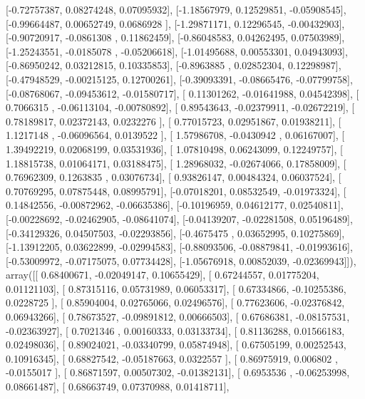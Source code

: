 \documentclass{article}
\begin{document}
       [-0.72757387,  0.08274248,  0.07095932],
       [-1.18567979,  0.12529851, -0.05908545],
       [-0.99664487,  0.00652749,  0.0686928 ],
       [-1.29871171,  0.12296545, -0.00432903],
       [-0.90720917, -0.0861308 ,  0.11862459],
       [-0.86048583,  0.04262495,  0.07503989],
       [-1.25243551, -0.0185078 , -0.05206618],
       [-1.01495688,  0.00553301,  0.04943093],
       [-0.86950242,  0.03212815,  0.10335853],
       [-0.8963885 ,  0.02852304,  0.12298987],
       [-0.47948529, -0.00215125,  0.12700261],
       [-0.39093391, -0.08665476, -0.07799758],
       [-0.08768067, -0.09453612, -0.01580717],
       [ 0.11301262, -0.01641988,  0.04542398],
       [ 0.7066315 , -0.06113104, -0.00780892],
       [ 0.89543643, -0.02379911, -0.02672219],
       [ 0.78189817,  0.02372143,  0.0232276 ],
       [ 0.77015723,  0.02951867,  0.01938211],
       [ 1.1217148 , -0.06096564,  0.0139522 ],
       [ 1.57986708, -0.0430942 ,  0.06167007],
       [ 1.39492219,  0.02068199,  0.03531936],
       [ 1.07810498,  0.06243099,  0.12249757],
       [ 1.18815738,  0.01064171,  0.03188475],
       [ 1.28968032, -0.02674066,  0.17858009],
       [ 0.76962309,  0.1263835 ,  0.03076734],
       [ 0.93826147,  0.00484324,  0.06037524],
       [ 0.70769295,  0.07875448,  0.08995791],
       [-0.07018201,  0.08532549, -0.01973324],
       [ 0.14842556, -0.00872962, -0.06635386],
       [-0.10196959,  0.04612177,  0.02540811],
       [-0.00228692, -0.02462905, -0.08641074],
       [-0.04139207, -0.02281508,  0.05196489],
       [-0.34129326,  0.04507503, -0.02293856],
       [-0.4675475 ,  0.03652995,  0.10275869],
       [-1.13912205,  0.03622899, -0.02994583],
       [-0.88093506, -0.08879841, -0.01993616],
       [-0.53009972, -0.07175075,  0.07734428],
       [-1.05676918,  0.00852039, -0.02369943]]), array([[ 0.68400671, -0.02049147,  0.10655429],
       [ 0.67244557,  0.01775204,  0.01121103],
       [ 0.87315116,  0.05731989,  0.06053317],
       [ 0.67334866, -0.10255386,  0.0228725 ],
       [ 0.85904004,  0.02765066,  0.02496576],
       [ 0.77623606, -0.02376842,  0.06943266],
       [ 0.78673527, -0.09891812,  0.00666503],
       [ 0.67686381, -0.08157531, -0.02363927],
       [ 0.7021346 ,  0.00160333,  0.03133734],
       [ 0.81136288,  0.01566183,  0.02498036],
       [ 0.89024021, -0.03340799,  0.05874948],
       [ 0.67505199,  0.00252543,  0.10916345],
       [ 0.68827542, -0.05187663,  0.0322557 ],
       [ 0.86975919,  0.006802  , -0.0155017 ],
       [ 0.86871597,  0.00507302, -0.01382131],
       [ 0.6953536 , -0.06253998,  0.08661487],
       [ 0.68663749,  0.07370988,  0.01418711],
\end{document}
